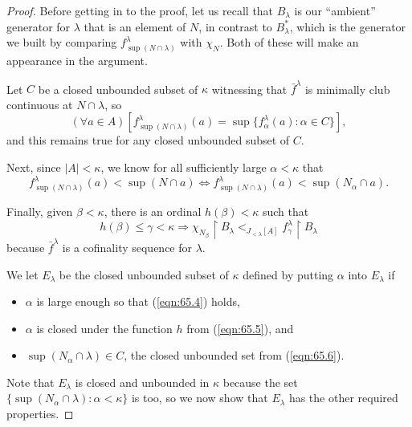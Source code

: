 \documentclass[10pt]{amsart}
\theoremstyle{plain}
\theoremstyle{definition}
\theoremstyle{remark}
\numberwithin{equation}{section}
\begin{document}
\begin{proof}
Before getting in to the proof, let us recall that $B_\lambda$ is our ``ambient'' generator for $\lambda$ that is an element of $N$,
 in contrast to $B^*_\lambda$, which is the generator we built by comparing $f^\lambda_{\sup(N\cap\lambda)}$ with $\chi_N$.
 Both of these will make an appearance in the argument.

Let $C$ be a closed unbounded subset of $\kappa$ witnessing that $\bar{f}^\lambda$ is minimally club continuous at $N\cap\lambda$,
so
\begin{equation}
\label{eqn:65.6}
(\forall a\in A)\left[f^\lambda_{\sup(N\cap\lambda)}(a) = \sup\{f^\lambda_\alpha(a):\alpha\in C\}\right],
\end{equation}
and this remains true for any closed unbounded subset of $C$.

Next, since  $|A|<\kappa$, we know for all sufficiently large $\alpha<\kappa$ that
\begin{equation}
\label{eqn:65.4}
f^\lambda_{\sup(N\cap\lambda)}(a)< \sup(N\cap a) \Longleftrightarrow f^\lambda_{\sup(N\cap\lambda)}(a)<\sup(N_\alpha\cap a).
\end{equation}


Finally, given  $\beta<\kappa$, there is an ordinal $h(\beta)<\kappa$ such that
\begin{equation}
\label{eqn:65.5}
h(\beta)\leq\gamma<\kappa\Longrightarrow
\chi_{N_\beta}\restriction B_\lambda<_{J_{<\lambda}[A]} f^\lambda_\gamma\restriction B_\lambda
\end{equation}
because $\bar{f}^\lambda$ is a cofinality sequence for $\lambda$.

We let $E_\lambda$ be the closed unbounded subset of $\kappa$ defined by putting $\alpha$ into $E_\lambda$ if
\begin{itemize}
\item $\alpha$ is large enough so that (\ref{eqn:65.4}) holds,
\item $\alpha$ is closed under the function $h$ from (\ref{eqn:65.5}), and
\item $\sup(N_\alpha\cap\lambda)\in C$, the closed unbounded set from (\ref{eqn:65.6}).
\end{itemize}
Note that $E_\lambda$ is closed and unbounded in $\kappa$ because the set $\{\sup(N_\alpha\cap\lambda):\alpha<\kappa\}$ is too,
 so we now show that $E_\lambda$ has the other required properties.



\end{proof}
\end{document}
